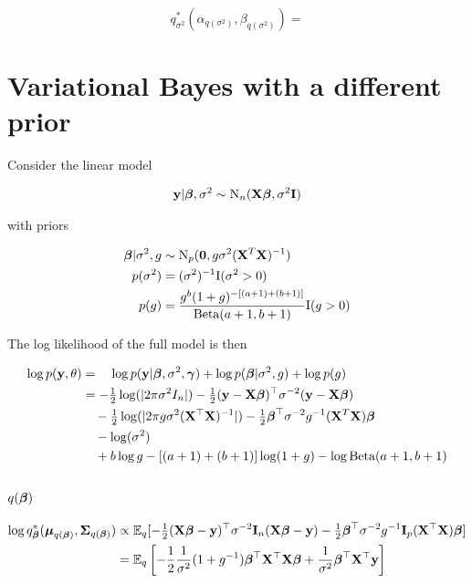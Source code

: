\documentclass{amsart}[12pt]
\begin{document}
\begin{equation*}
q^*_{\sigma^2}(\alpha_{q(\sigma^2)}, \beta_{q(\sigma^2)}) = 
\end{equation*}

\section{Variational Bayes with a different prior}

Consider the linear model

\begin{align*}
{\bf y} | {\boldsymbol \beta}, \sigma^2 \sim \text{N}_n({\bf X} {\boldsymbol \beta}, \sigma^2 {\bf I})
\end{align*}

with priors

\begin{align*}
{\boldsymbol\beta} | \sigma^2, g &\sim \text{N}_p({\bf 0}, g \sigma^2 ({\bf X}^T {\bf X})^{-1}) \\
p(\sigma^2) &= (\sigma^2)^{-1} \text{I}(\sigma^2 > 0) \\
p(g) &= \frac{g^b (1 + g)^{-[(a + 1) + (b + 1)]}}{\text{Beta} (a + 1, b + 1)} \text{I}(g > 0)
\end{align*}

The log likelihood of the full model is then

\begin{align*}
\log p({\bf y}, \theta) &= \quad\log p({\bf y}|{\boldsymbol \beta}, \sigma^2, {\boldsymbol \gamma}) + \log p({\boldsymbol \beta} | \sigma^2, g) +  \log p(g) \\
&= -\tfrac{1}{2} \log(|2 \pi \sigma^2 I_n|) - \tfrac{1}{2} ({\bf y} - {\bf X} {\boldsymbol \beta})^\top \sigma^{-2} ({\bf y} - {\bf X} {\boldsymbol \beta}) \\
&\quad -\tfrac{1}{2} \log(|2 \pi g \sigma^2 ({\bf X}^\top {\bf X})^{-1}|) -\tfrac{1}{2} {\boldsymbol \beta}^\top \sigma^{-2} g^{-1} ({\bf X}^T {\bf X}) {\boldsymbol \beta} \\
&\quad - \log (\sigma^2) \\
&\quad + b \log g - [(a + 1) + (b + 1)] \log (1 + g) - \log \text{Beta} (a + 1, b + 1)
\end{align*}

\subsection{$q({\boldsymbol \beta})$}

\begin{align*}
\log q_{\boldsymbol \beta}^*({\boldsymbol \mu}_{q({\boldsymbol \beta})}, {\boldsymbol \Sigma}_{q({\boldsymbol \beta})}) &\propto \mathbb{E}_q[-\tfrac{1}{2} ({\bf X} {\boldsymbol \beta} - {\bf y})^\top \sigma^{-2} {\bf I}_n ({\bf X} {\boldsymbol \beta} - {\bf y}) - \tfrac{1}{2} {\boldsymbol \beta}^\top \sigma^{-2} g^{-1} {\bf I}_p ({\bf X}^\top {\bf X}) {\boldsymbol \beta}] \\
&= \mathbb{E}_q \left[-\frac{1}{2} \frac{1}{\sigma^2} (1 + g^{-1}){\boldsymbol \beta}^\top {\bf X}^\top {\bf X} {\boldsymbol\beta} + \frac{1}{\sigma^2}{\boldsymbol \beta}^\top {\bf X}^\top {\bf y} \right]
\end{align*}
\end{document}
